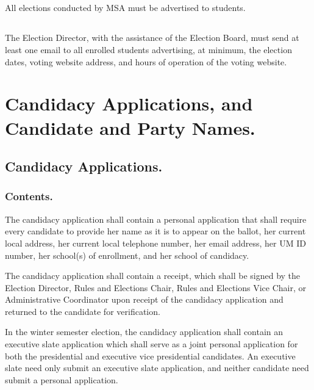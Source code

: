 \subsection{}
All elections conducted by MSA must be advertised to students.

\subsection{}
The Election Director, with the assistance of the Election Board, must send at least one email to all enrolled students advertising, at minimum, the election dates, voting website address, and hours of operation of the voting website.


\section{Candidacy Applications, and Candidate and Party Names.}

\subsection{Candidacy Applications.}

\subsubsection{Contents.}

The candidacy application shall contain a personal application that shall require every candidate to provide her name as it is to appear on the ballot, her current local address, her current local telephone number, her email address, her UM ID number, her school(s) of enrollment, and her school of candidacy. 

The candidacy application shall contain a receipt, which shall be signed by the Election Director, Rules and Elections Chair, Rules and Elections Vice Chair, or Administrative Coordinator upon receipt of the candidacy application and returned to the candidate for verification.

In the winter semester election, the candidacy application shall contain an executive slate application which shall serve as a joint personal application for both the presidential and executive vice presidential candidates.  An executive slate need only submit an executive slate application, and neither candidate need submit a personal application.


